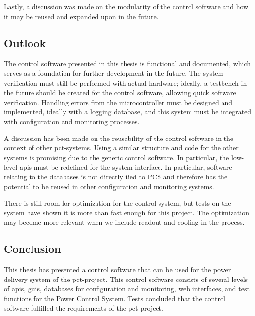 \documentclass[main.tex]{subfiles}
\begin{document}
Lastly, a discussion was made on the modularity of the control software and how it may be reused and expanded upon in the future.

\subsection{Outlook}
The control software presented in this thesis is functional and documented, which serves as a foundation for further development in the future. The system verification must still be performed with actual hardware; ideally, a testbench in the future should be created for the control software, allowing quick software verification. Handling errors from the microcontroller must be designed and implemented, ideally with a logging database, and this system must be integrated with configuration and monitoring processes.

A discussion has been made on the reusability of the control software in the context of other \gls{pct}-systems. Using a similar structure and code for the other systems is promising due to the generic control software. In particular, the low-level \gls{api}s must be redefined for the system interface. In particular, software relating to the databases is not directly tied to PCS and therefore has the potential to be reused in other configuration and monitoring systems.

There is still room for optimization for the control system, but tests on the system have shown it is more than fast enough for this project. The optimization may become more relevant when we include readout and cooling in the process.

\subsection{Conclusion}

This thesis has presented a control software that can be used for the power delivery system of the \gls{pct}-project. This control software consists of several levels of \gls{api}s, \gls{gui}s, databases for configuration and monitoring, web interfaces, and test functions for the Power Control System. Tests concluded that the control software fulfilled the requirements of the \gls{pct}-project.
\end{document}
